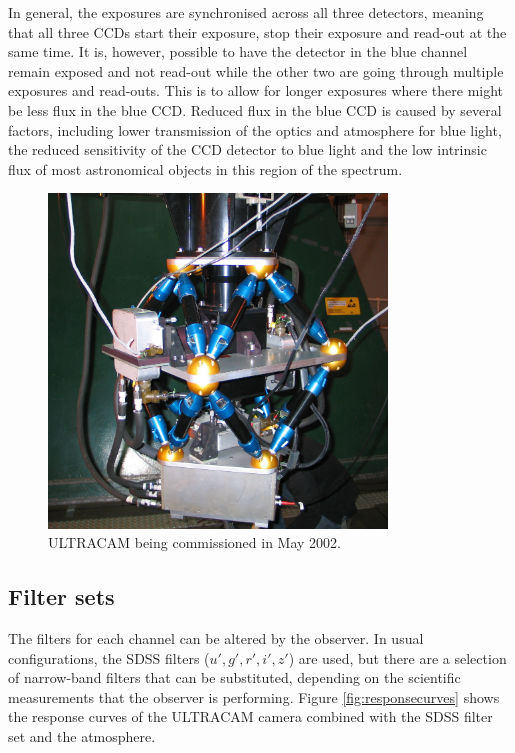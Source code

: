 In general, the exposures are synchronised across all three detectors, meaning that all three CCDs start their exposure, stop their exposure and read-out at the same time. It is, however, possible to have the detector in the blue channel remain exposed and not read-out while the other two are going through multiple exposures and read-outs. This is to allow for longer exposures where there might be less flux in the blue CCD. Reduced flux in the blue CCD is caused by several factors, including lower transmission of the optics and atmosphere for blue light, the reduced sensitivity of the CCD detector to blue light and the low intrinsic flux of most astronomical objects in this region of the spectrum.

\begin{figure}
\centering
\includegraphics[width=90mm]{images/IMG_0121_scaled.JPG}
\caption{ULTRACAM being commissioned in May 2002.}
\label{fig:ultracam}
\end{figure}

\subsection{Filter sets}
The filters for each channel can be altered by the observer. In usual configurations, the SDSS filters ($u', g', r', i', z'$) are used, but there are a selection of narrow-band filters that can be substituted, depending on the scientific measurements that the observer is performing. Figure \ref{fig:responsecurves} shows the response curves of the ULTRACAM camera combined with the SDSS filter set and the atmosphere. 

